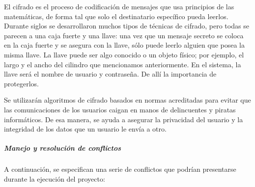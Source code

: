 \begin{itemize}
		El cifrado es el proceso de codificación de mensajes que usa principios de las matemáticas, de forma tal que solo el destinatario específico pueda leerlos.
		Durante siglos se desarrollaron muchos tipos de técnicas de cifrado, pero todas se parecen a una caja fuerte y una llave: una vez que un mensaje secreto se coloca en la caja fuerte y se asegura con la llave, sólo puede leerlo alguien que posea la misma llave. 
	    La llave puede ser algo conocido o un objeto físico; por ejemplo, el largo y el ancho del cilindro que mencionamos anteriormente.
        En el sistema, la llave será el nombre de usuario y contraseña.
        De allí la importancia de protegerlos.

		Se utilizarán algoritmos de cifrado basados en normas acreditadas para evitar que las comunicaciones de los usuarios caigan en manos de delincuentes y piratas informáticos. De esa manera, se ayuda a asegurar la privacidad del usuario y la integridad de los datos que un usuario le envía a otro.
    \end{itemize}
    

\subparagraph{Manejo y resolución de conflictos}

A continuación, se especifican una serie de conflictos que podrían presentarse durante la ejecución del proyecto:

